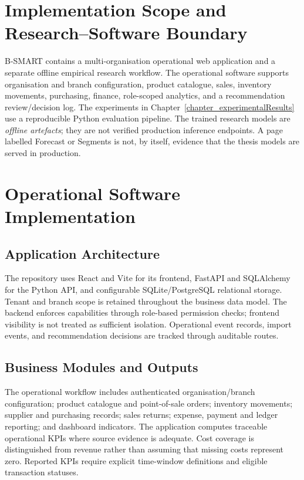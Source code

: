 \section{Implementation Scope and Research--Software Boundary}

B-SMART contains a multi-organisation operational web application and a separate offline empirical research workflow. The operational software supports organisation and branch configuration, product catalogue, sales, inventory movements, purchasing, finance, role-scoped analytics, and a recommendation review/decision log. The experiments in Chapter~\ref{chapter_experimentalResults} use a reproducible Python evaluation pipeline. The trained research models are \emph{offline artefacts}; they are not verified production inference endpoints. A page labelled Forecast or Segments is not, by itself, evidence that the thesis models are served in production.

\section{Operational Software Implementation}
\subsection{Application Architecture}

The repository uses React and Vite for its frontend, FastAPI and SQLAlchemy for the Python API, and configurable SQLite/PostgreSQL relational storage. Tenant and branch scope is retained throughout the business data model. The backend enforces capabilities through role-based permission checks; frontend visibility is not treated as sufficient isolation. Operational event records, import events, and recommendation decisions are tracked through auditable routes.

\subsection{Business Modules and Outputs}

The operational workflow includes authenticated organisation/branch configuration; product catalogue and point-of-sale orders; inventory movements; supplier and purchasing records; sales returns; expense, payment and ledger reporting; and dashboard indicators. The application computes traceable operational KPIs where source evidence is adequate. Cost coverage is distinguished from revenue rather than assuming that missing costs represent zero. Reported KPIs require explicit time-window definitions and eligible transaction statuses.

